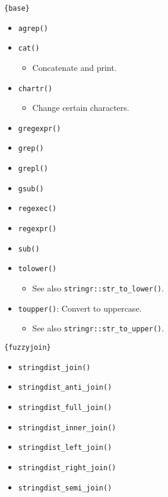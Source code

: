 \documentclass[
]{book}
\providecommand{\tightlist}{%
  \setlength{\itemsep}{0pt}\setlength{\parskip}{0pt}}
\begin{document}
\texttt{\{base\}}

\begin{itemize}
\tightlist
\item
  \texttt{agrep()}
\item
  \texttt{cat()}

  \begin{itemize}
  \tightlist
  \item
    Concatenate and print.
  \end{itemize}
\item
  \texttt{chartr()}

  \begin{itemize}
  \tightlist
  \item
    Change certain characters.
  \end{itemize}
\item
  \texttt{gregexpr()}
\item
  \texttt{grep()}
\item
  \texttt{grepl()}
\item
  \texttt{gsub()}
\item
  \texttt{regexec()}
\item
  \texttt{regexpr()}
\item
  \texttt{sub()}
\item
  \texttt{tolower()}

  \begin{itemize}
  \tightlist
  \item
    See also \texttt{stringr::str\_to\_lower()}.
  \end{itemize}
\item
  \texttt{toupper()}: Convert to uppercase.

  \begin{itemize}
  \tightlist
  \item
    See also \texttt{stringr::str\_to\_upper()}.
  \end{itemize}
\end{itemize}

\texttt{\{fuzzyjoin\}}

\begin{itemize}
\tightlist
\item
  \texttt{stringdist\_join()}
\item
  \texttt{stringdist\_anti\_join()}
\item
  \texttt{stringdist\_full\_join()}
\item
  \texttt{stringdist\_inner\_join()}
\item
  \texttt{stringdist\_left\_join()}
\item
  \texttt{stringdist\_right\_join()}
\item
  \texttt{stringdist\_semi\_join()}
\end{itemize}
\end{document}

